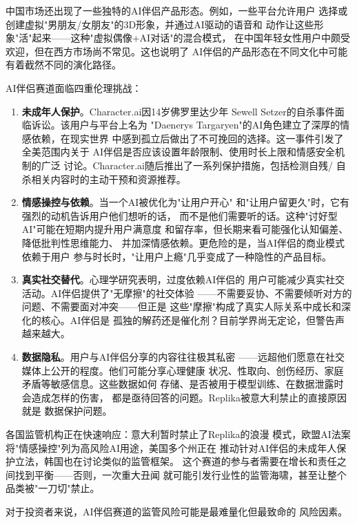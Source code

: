 中国市场还出现了一些独特的AI伴侣产品形态。例如，一些平台允许用户
选择或创建虚拟"男朋友/女朋友"的3D形象，并通过AI驱动的语音和
动作让这些形象"活"起来——这种"虚拟偶像+AI对话"的混合模式，
在中国年轻女性用户中颇受欢迎，但在西方市场尚不常见。这也说明了
AI伴侣的产品形态在不同文化中可能有着截然不同的演化路径。

\begin{warnbox}[AI伴侣的伦理边界]
AI伴侣赛道面临四重伦理挑战：

\begin{enumerate}
  \item \textbf{未成年人保护}。Character.ai因14岁佛罗里达少年
    Sewell Setzer的自杀事件面临诉讼。该用户与平台上名为
    "Daenerys Targaryen"的AI角色建立了深厚的情感依赖，在现实世界
    中感到孤立后做出了不可挽回的选择。这一事件引发了全美范围内关于
    AI伴侣是否应该设置年龄限制、使用时长上限和情感安全机制的广泛
    讨论。Character.ai随后推出了一系列保护措施，包括检测自残/
    自杀相关内容时的主动干预和资源推荐。
  \item \textbf{情感操控与依赖}。当一个AI被优化为"让用户开心"
    和"让用户留更久"时，它有强烈的动机告诉用户他们想听的话，
    而不是他们需要听的话。这种"讨好型AI"可能在短期内提升用户满意度
    和留存率，但长期来看可能强化认知偏差、降低批判性思维能力、
    并加深情感依赖。更危险的是，当AI伴侣的商业模式依赖于用户
    参与时长时，"让用户上瘾"几乎变成了一种隐性的产品目标。
  \item \textbf{真实社交替代}。心理学研究表明，过度依赖AI伴侣的
    用户可能减少真实社交活动。AI伴侣提供了"无摩擦"的社交体验
    ——不需要妥协、不需要倾听对方的问题、不需要面对冲突——但正是
    这些"摩擦"构成了真实人际关系中成长和深化的核心。AI伴侣是
    孤独的解药还是催化剂？目前学界尚无定论，但警告声越来越大。
  \item \textbf{数据隐私}。用户与AI伴侣分享的内容往往极其私密
    ——远超他们愿意在社交媒体上公开的程度。他们可能分享心理健康
    状况、性取向、创伤经历、家庭矛盾等敏感信息。这些数据如何
    存储、是否被用于模型训练、在数据泄露时会造成怎样的伤害，
    都是亟待回答的问题。Replika被意大利禁止的直接原因就是
    数据保护问题。
\end{enumerate}

\noindent 各国监管机构正在快速响应：意大利暂时禁止了Replika的浪漫
模式，欧盟AI法案将"情感操控"列为高风险AI用途，美国多个州正在
推动针对AI伴侣的未成年人保护立法，韩国也在讨论类似的监管框架。
这个赛道的参与者需要在增长和责任之间找到平衡——否则，一次重大丑闻
就可能引发行业性的监管海啸，甚至让整个品类被"一刀切"禁止。

对于投资者来说，AI伴侣赛道的监管风险可能是最难量化但最致命的
风险因素。
\end{warnbox}

